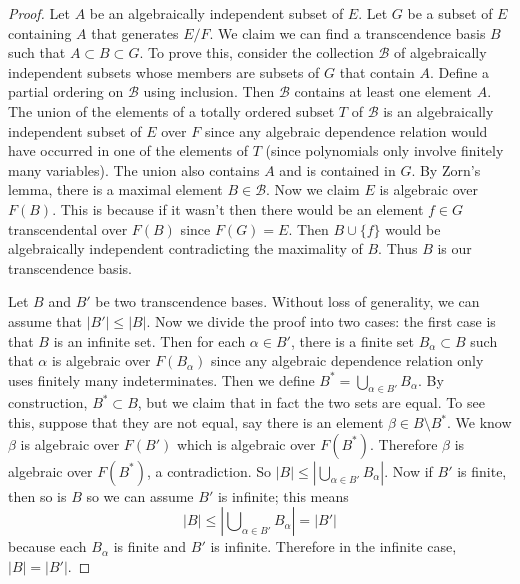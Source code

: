\documentclass{stacks-project}
\theoremstyle{plain}
\theoremstyle{definition}
\theoremstyle{remark}
\numberwithin{equation}{subsection}
\begin{document}
\begin{proof}
Let $A$ be an algebraically independent subset of $E$. Let $G$ be a subset
of $E$ containing $A$ that generates $E/F$. We claim we can find a
transcendence basis $B$ such that $A \subset B \subset G$.
To prove this, consider the collection $\mathcal{B}$ of algebraically
independent subsets whose members are subsets of $G$ that contain $A$.
Define a partial ordering on $\mathcal{B}$ using inclusion.
Then $\mathcal{B}$ contains at least one element $A$.
The union of the elements of a totally ordered subset $T$ of $\mathcal{B}$
is an algebraically independent subset of $E$ over $F$ since any algebraic
dependence relation would have occurred in one of the elements of $T$
(since polynomials only involve finitely many variables). The union also
contains $A$ and is contained in $G$. By Zorn's lemma, there is a maximal
element $B \in \mathcal{B}$. Now we claim $E$ is algebraic over $F(B)$.
This is because if it wasn't then there would be an element
$f \in G$ transcendental over $F(B)$ since $F(G) = E$. Then
$B \cup\{f\}$ would be algebraically independent contradicting the
maximality of $B$. Thus $B$ is our transcendence basis.

\medskip\noindent
Let $B$ and $B'$ be two transcendence bases. Without loss of generality, we
can assume that $|B'| \leq |B|$. Now we divide the proof into two cases: the
first case is that $B$ is an infinite set. Then for each $\alpha \in B'$,
there is a finite set $B_{\alpha} \subset B$ such that $\alpha$ is algebraic
over
$F(B_{\alpha})$ since any algebraic dependence relation only uses finitely many
indeterminates. Then we define $B^* = \bigcup_{\alpha\in B'} B_{\alpha}$.
By construction, $B^* \subset B$, but we claim that in fact the two sets are
equal. To see this, suppose that they are not equal, say there is an element
$\beta \in B \setminus B^*$. We know $\beta$ is algebraic over $F(B')$ which
is algebraic over $F(B^*)$. Therefore $\beta$ is algebraic over $F(B^*)$, a
contradiction. So $|B| \leq |\bigcup_{\alpha \in B'} B_{\alpha}|$.
Now if $B'$ is finite, then so is $B$ so we can assume $B'$ is infinite;
this means
$$
|B| \leq |\bigcup\nolimits_{\alpha \in B'} B_{\alpha}| = |B'|
$$
because each $B_\alpha$ is finite and $B'$ is infinite. Therefore in the
infinite case, $|B| = |B'|$.


\end{proof}
\end{document}
